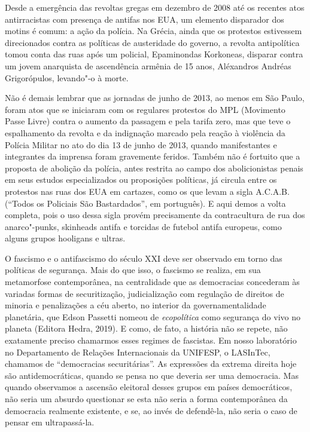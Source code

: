 Desde a emergência das revoltas gregas em dezembro de 2008 até os
recentes atos antirracistas com presença de antifas nos EUA, um elemento
disparador dos motins é comum: a ação da polícia. Na Grécia, ainda que
os protestos estivessem direcionados contra as políticas de austeridade
do governo, a revolta antipolítica tomou conta das ruas após um
policial, Epaminondas Korkoneas, disparar contra um jovem anarquista de
ascendência armênia de 15 anos, Aléxandros Andréas Grigorópulos,
levando"-o à morte.

Não é demais lembrar que as jornadas de junho de 2013, ao menos em São
Paulo, foram atos que se iniciaram com os regulares protestos do MPL
(Movimento Passe Livre) contra o aumento da passagem e pela tarifa zero,
mas que teve o espalhamento da revolta e da indignação marcado pela
reação à violência da Polícia Militar no ato do dia 13 de junho de 2013,
quando manifestantes e integrantes da imprensa foram gravemente feridos.
Também não é fortuito que a proposta de abolição da polícia, antes
restrita ao campo dos abolicionistas penais em seus estudos
especializados ou proposições políticas, já circula entre os protestos
nas ruas dos EUA em cartazes, como os que levam a sigla A.C.A.B.
(``Todos os Policiais São Bastardados'', em português). E aqui demos a
volta completa, pois o uso dessa sigla provém precisamente da
contracultura de rua dos anarco"-punks, skinheads antifa e torcidas de
futebol antifa europeus, como alguns grupos hooligans e ultras.

O fascismo e o antifascismo do século XXI deve ser observado em torno
das políticas de segurança. Mais do que isso, o fascismo se realiza, em
sua metamorfose contemporânea, na centralidade que as democracias
concederam às variadas formas de securitização, judicialização com
regulação de direitos de minoria e penalizações a céu aberto, no
interior da governamentalidade planetária, que Edson Passetti nomeou de
\emph{ecopolítica} como segurança do vivo no planeta (Editora Hedra,
2019). E como, de fato, a história não se repete, não exatamente preciso
chamarmos esses regimes de fascistas. Em nosso laboratório no
Departamento de Relações Internacionais da UNIFESP, o LASInTec, chamamos
de ``democracias securitárias''. As expressões da extrema direita hoje
são antidemocráticas, quando se pensa no que deveria ser uma democracia.
Mas quando observamos a ascensão eleitoral desses grupos em países
democráticos, não seria um absurdo questionar se esta não seria a forma
contemporânea da democracia realmente existente, e se, ao invés de
defendê-la, não seria o caso de pensar em ultrapassá-la.

